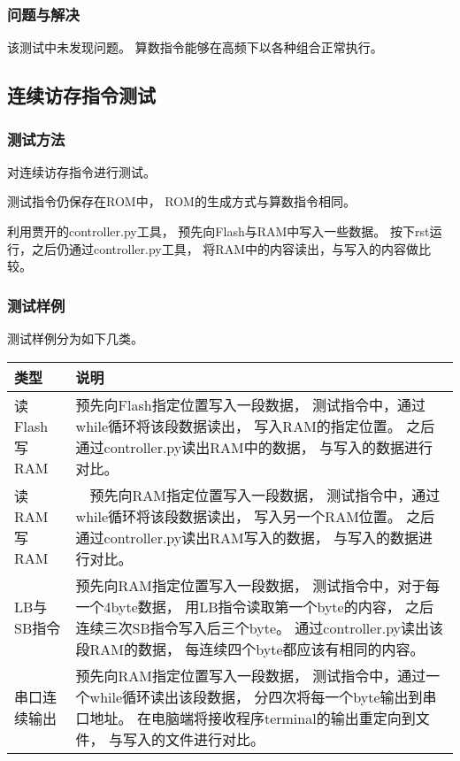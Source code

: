         \subsubsection{问题与解决}
            该测试中未发现问题。%
            算数指令能够在高频下以各种组合正常执行。


    \subsection{连续访存指令测试}
        \subsubsection{测试方法}
            对连续访存指令进行测试。%

            测试指令仍保存在ROM中，%
            ROM的生成方式与算数指令相同。

            利用贾开的controller.py工具，%
            预先向Flash与RAM中写入一些数据。%
            按下rst运行，之后仍通过controller.py工具，%
            将RAM中的内容读出，与写入的内容做比较。%

        \subsubsection{测试样例}
            测试样例分为如下几类。
            \begin{table}[!hbp]
            \centering
            \begin{tabularx}{\textwidth}{|l|X|}
            \hline
            类型 & 说明 \\
            \hline
            读Flash写RAM & 预先向Flash指定位置写入一段数据，%
                            测试指令中，通过while循环将该段数据读出，%
                            写入RAM的指定位置。%
                            之后通过controller.py读出RAM中的数据，%
                            与写入的数据进行对比。 \\
            \hline
            读RAM写RAM &　预先向RAM指定位置写入一段数据，%
                        测试指令中，通过while循环将该段数据读出，%
                        写入另一个RAM位置。%
                        之后通过controller.py读出RAM写入的数据，%
                        与写入的数据进行对比。 \\
            \hline
            LB与SB指令 & 预先向RAM指定位置写入一段数据，%
                        测试指令中，对于每一个4byte数据，%
                        用LB指令读取第一个byte的内容，%
                        之后连续三次SB指令写入后三个byte。%
                        通过controller.py读出该段RAM的数据，%
                        每连续四个byte都应该有相同的内容。 \\
            \hline
            串口连续输出 & 预先向RAM指定位置写入一段数据，%
                         测试指令中，通过一个while循环读出该段数据，%
                         分四次将每一个byte输出到串口地址。%
                         在电脑端将接收程序terminal的输出重定向到文件，%
                         与写入的文件进行对比。    \\
            \hline
            \end{tabularx}
            \end{table}

